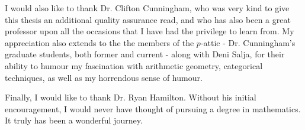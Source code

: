         I would also like to thank Dr. Clifton Cunningham, who was very kind to give this thesis an additional quality assurance read, and who has also been a great professor upon all the occasions that I have had the privilege to learn from. My appreciation also extends to the the members of the $p$-attic - Dr. Cunningham's graduate students, both former and current - along with Deni Salja, for their ability to humour my fascination with arithmetic geometry, categorical techniques, as well as my horrendous sense of humour.
        
        Finally, I would like to thank Dr. Ryan Hamilton. Without his initial encouragement, I would never have thought of pursuing a degree in mathematics. It truly has been a wonderful journey.